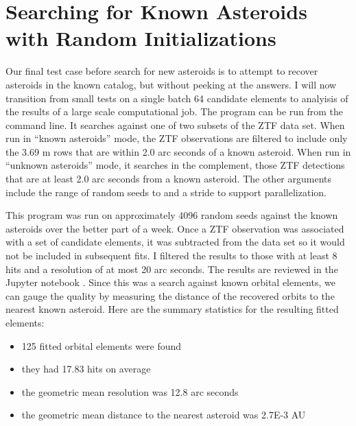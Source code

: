 \section{Searching for Known Asteroids with Random Initializations}
\label{section_results_known_ast_random}
Our final test case before search for new asteroids is to attempt to recover asteroids in the known catalog, but without peeking at the answers.
I will now transition from small tests on a single batch 64 candidate elements to analyisis of the results of a large scale computational job.
The program  can be run from the command line.
It searches against one of two subsets of the ZTF data set.
When run in ``known asteroids'' mode, the ZTF observations are filtered to include only the 3.69 m rows that are within 2.0 arc seconds of a known asteroid.
When run in ``unknown asteroids'' mode, it searches in the complement, those ZTF detections that are at least 2.0 arc seconds from a known asteroid.
The other arguments include the range of random seeds  to  and a stride to support parallelization.

This program was run on approximately 4096 random seeds against the known asteroids over the better part of a week.
Once a ZTF observation was associated with a set of candidate elements, it was subtracted from the data set so it would not be included in subsequent fits.
I filtered the results to those with at least 8 hits and a resolution of at most 20 arc seconds.
The results are reviewed in the Jupyter notebook .
Since this was a search against known orbital elements, 
we can gauge the quality by measuring the distance of the recovered orbits to the nearest known asteroid.
Here are the summary statistics for the resulting fitted elements:
\begin{itemize}
\item 125 fitted orbital elements were found
\item they had 17.83 hits on average
\item the geometric mean resolution was 12.8 arc seconds
\item the geometric mean distance to the nearest asteroid was 2.7E-3 AU
\end{itemize}

